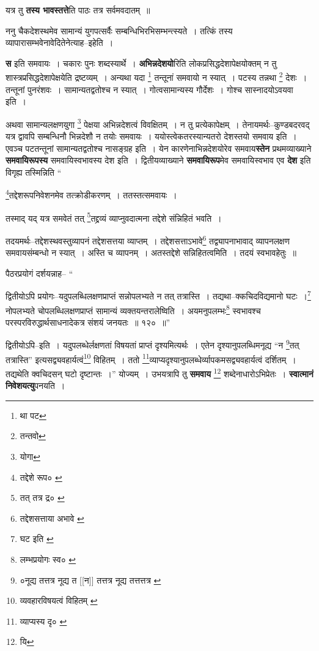 \documentclass[article,12pt,a4paper]{memoir}
\begin{document}
	  \pstart यत्र तु \textbf{तस्य भावस्तत्ते}ति पाठः तत्र सर्वमवदातम् ॥
	\pend
      

	  \pstart ननु चैकदेशस्थमेव सामान्यं युगपत्सर्वैः सम्बन्धिभिरभिसम्भन्त्स्यते । तत्किं तस्य व्यापारासम्भवेनावेदितेनेत्याह--इहेति ।
	\pend
      

	  \pstart \textbf{स} इति समवायः । चकारः पुनः शब्दस्यार्थे । \textbf{अभिन्नदेशयो}रिति लोकप्रसिद्धदेशापेक्षयोक्तम् न तु शास्त्रप्रसिद्धदेशापेक्षयेति द्रष्टव्यम् । अन्यथा यदा \footnote{था पट} तन्तूनां समवायो न स्यात् । पटस्य तन्नथा \footnote{तन्तवो} देशः । तन्तूनां पुनरंशवः । सामान्यतद्वतोश्च न स्यात् । गोत्वसामान्यस्य गौर्देशः । गोश्च सास्नादयोऽवयवा इति ।
	\pend
      

	  \pstart अथवा सामान्यलक्षणयुगा \footnote{योगा} पेक्षया अभिन्नदेशत्वं विवक्षितम् । न तु प्रत्येकापेक्षम् । तेनायमर्थः--कुण्डबदरवद् यत्र द्वावपि सम्बन्धिनौ भिन्नदेशौ न तयोः समवायः । ययोस्त्वेकतरस्यान्यतरो देशस्तयो समवाय इति । एवञ्च पटतन्तूनां सामान्यतद्वतोश्च नासङ्ग्रह इति । येन कारणेनाभिन्नदेशयोरेव समवाय\textbf{स्तेन} प्रथमव्याख्याने \textbf{समवायिरूपस्य} समवायिस्वभावस्य देश इति । द्वितीयव्याख्याने \textbf{समवायिरूप}मेव समवायिस्वभाव एव \textbf{देश} इति विगृह्य तस्मिन्निति  \leavevmode{} “
	  
	\footnote{तद्देशे रूप० \cite{dp-msD}}तद्देशरूपनिवेशनमेव तत्क्रोडीकरणम् । ततस्तत्समवायः । 
	  
	तस्माद् यद् यत्र समवेतं तत् \footnote{तत् तत्र द्र० \cite{dp-edE}}तद्द्रव्यं व्याप्नुवदात्मना तद्देशे संन्निहितं भवति । 
	  
	तदयमर्थः--तद्देशस्थवस्तुव्यापनं तद्देशसत्तया व्याप्तम् । तद्देशसत्ताऽभावे\footnote{तद्देशसत्ताया अभावे \cite{dp-msB} \cite{dp-msC}} तद्व्यापनाभावाद् व्यापनलक्षण समवायसंम्बन्धो न स्यात् । अस्ति च व्यापनम् । अतस्तद्देशे सन्निहितत्वमिति । तदयं स्वभावहेतुः ॥ 
	  
	पैठरप्रयोगं दर्शयन्नाह-- “
	  
	द्वितीयोऽपि प्रयोगः--यदुपलब्धिलक्षणप्राप्तं सन्नोपलभ्यते न तत् तत्रास्ति । तद्यथा--क्कचिदविद्यमानो घटः ।\footnote{घट इति \cite{dp-msC}} नोपलभ्यते चोपलब्धिलक्षणप्राप्तं सामान्यं व्यक्तयन्तरालेष्विति । अयमनुपलम्भः\footnote{लम्भप्रयोगः स्व० \cite{dp-msD} \cite{dp-msB} \cite{dp-edP} \cite{dp-edH} \cite{dp-edE} \cite{dp-edN}} स्वभावश्च परस्परविरुद्धार्थसाधनादेकत्र संशयं जनयतः ॥ १२० ॥” 
	  
	द्वितीयोऽपि--इति । यदुपलब्धेर्लक्षणतां विषयतां प्राप्तं दृश्यमित्यर्थः । एतेन दृश्यानुपलब्धिमनूद्य “न \footnote{०नूद्य तत्तत्र \cite{dp-msB} नूद्य त [[न]] तत्तत्र \cite{dp-msA} नूद्य तत्तत्तत्र \cite{dp-edP} \cite{dp-edH}}तत् तत्रास्ति” इत्यसद्व्यवहार्यत्वं\footnote{व्यवहारविषयत्वं विहितम् \cite{dp-msD}} विहितम् । ततो \footnote{व्याप्यस्य दृ० \cite{dp-edE}}व्याप्यदृश्यानुपलब्धेर्व्यापकमसद्व्यवहार्यत्वं दर्शितम् । तद्यथेति क्वचिदसन् घटो दृष्टान्तः ।” योज्यम् । उभयत्रापि तु \textbf{समवाय} \footnote{यि} शब्देनाधारोऽभिप्रेतः । \textbf{स्वात्मानं निवेशयत्यु}पनयति ।
	\pend
      
\end{document}
